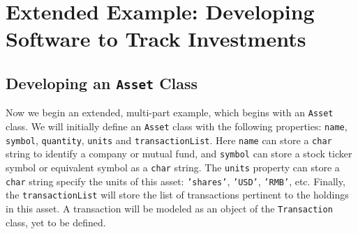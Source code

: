 \section{Extended Example: Developing Software to Track Investments}

\subsection{Developing an \texttt{Asset} Class} \label{subsect:AssetClass}

Now we begin an extended, multi-part example, which begins with an \texttt{Asset} class. We will initially define an \texttt{Asset} class with the following properties: \texttt{name}, \texttt{symbol}, \texttt{quantity}, \texttt{units} and \texttt{transactionList}. Here \texttt{name} can store a \texttt{char} string to identify a company or mutual fund, and \texttt{symbol} can store a stock ticker symbol or equivalent symbol as a \texttt{char} string. The \texttt{units} property can store a \texttt{char} string specify the units of this asset: \texttt{'shares'}, \texttt{'USD'},  \texttt{'RMB'}, etc. Finally, the \texttt{transactionList} will store the list of transactions pertinent to the holdings in this asset. A transaction will be modeled as an object of the \texttt{Transaction} class, yet to be defined.

